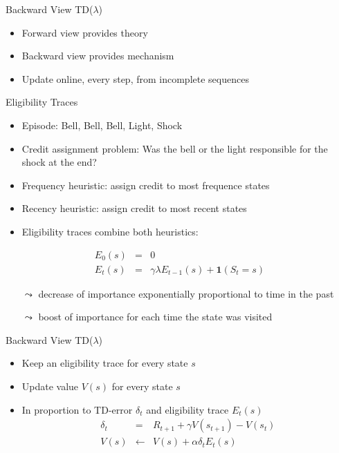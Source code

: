 \begin{frame}[c]{Backward View TD($\lambda$)}
	
	\begin{itemize}
		\item Forward view provides theory
		\item Backward view provides mechanism
		\item Update online, every step, from incomplete sequences
	\end{itemize}	
	
\end{frame}
\begin{frame}[c]{Eligibility Traces}
	
	\begin{itemize}
		\item Episode: Bell, Bell, Bell, Light, Shock
		\item Credit assignment problem: Was the bell or the light responsible for the shock at the end?
		\pause
		\item Frequency heuristic: assign credit to most frequence states
		\item Recency heuristic: assign credit to most recent states
		\item Eligibility traces combine both heuristics:
	\end{itemize}	

\begin{eqnarray}
E_0(s) &=& 0 \nonumber\\
E_t(s) &=& \gamma \lambda E_{t-1}(s) + \mathbf{1}(S_t=s) \nonumber
\end{eqnarray}

\begin{itemize}
	\item[$\leadsto$] decrease of importance exponentially proportional to time in the past
	\item[$\leadsto$] boost of importance for each time the state was visited
\end{itemize}
	
\end{frame}
\begin{frame}[c]{Backward View TD($\lambda$)}
	

\begin{itemize}
	\item Keep an eligibility trace for every state $s$
	\item Update value $V(s)$ for every state $s$
	\item In proportion to TD-error $\delta_t$ and eligibility trace $E_t(s)$
	\begin{eqnarray}
	\delta_t &=& R_{t+1} + \gamma V(s_{t+1}) - V(s_t)\nonumber\\
	V(s) &\gets& V(s) + \alpha \delta_t E_t(s)\nonumber
	\end{eqnarray}
\end{itemize}

\end{frame}
